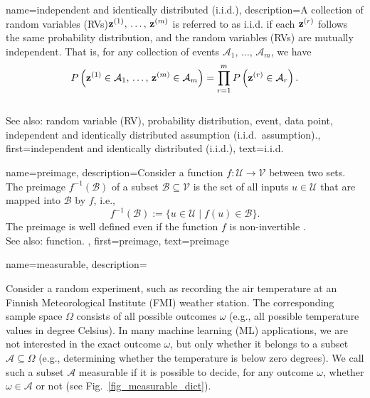 {
{name={independent and identically distributed (i.i.d.)}, 
	description={A collection of random variables (RVs)\linebreak ${\bf z}^{(1)}, \,\ldots, \,{\bf z}^{(m)}$ is 
		referred to as i.i.d. 
		if each ${\bf z}^{(r)}$ follows the same probability distribution, and 
		the random variables (RVs) are mutually independent. That is, for any collection of 
		events $\mathcal{A}_1, \,\ldots, \,\mathcal{A}_m$, we have
       		\[
          		P\left( {\bf z}^{(1)} \in \mathcal{A}_1, \,\ldots, \,{\bf z}^{(m)} \in \mathcal{A}_{m}\right) 
         		= \prod_{r=1}^{m} P\left( {\bf z}^{(r)} \in \mathcal{A}_r\right).
         	\]
				\\
		See also: random variable (RV), probability distribution, event, data point, independent and identically distributed assumption (i.i.d.\ assumption).},
	first={independent and identically distributed (i.i.d.)},
	text={{i.i.d.}} 
}

{name={preimage}, 
	description={Consider a function $f\colon \mathcal{U} \rightarrow \mathcal{V}$ 
		between two sets. The preimage $f^{-1}(\mathcal{B})$ of a subset $\mathcal{B} \subseteq \mathcal{V}$ is the set 
		of all inputs $u \in \mathcal{U}$ that are mapped into $\mathcal{B}$ by $f$, i.e.,
		\[
		f^{-1}(\mathcal{B}) := \{ u \in \mathcal{U} \mid f(u) \in \mathcal{B} \}.
		\]
		The preimage is well defined even if the function $f$ is non-invertible \cite{RudinBookPrinciplesMatheAnalysis}.
		\\
		See also: function. },
	first={preimage},
	text={preimage}
}

{name={measurable}, 
	description={Consider a random experiment, such as recording 
	the air temperature at an Finnish Meteorological Institute (FMI) weather station. The corresponding sample space 
	$\Omega$ consists of all possible outcomes $\omega$ (e.g., 
		all possible temperature values in degree Celsius). In many machine learning (ML) 
		applications, we are not interested in the exact outcome $\omega$, but only 
		whether it belongs to a subset $\mathcal{A} \subseteq \Omega$ 
		(e.g., determining whether the temperature is below zero degrees). 
		We call such a subset $\mathcal{A}$ measurable if it is possible to 
		decide, for any outcome $\omega$, whether $\omega \in \mathcal{A}$ 
		or not (see Fig.\ \ref{fig_measurable_dict}). \\
		\begin{figure}[H]
		\begin{center}
		\begin{tikzpicture}
			

\end{tikzpicture}
\end{center}
\end{figure}}}}
